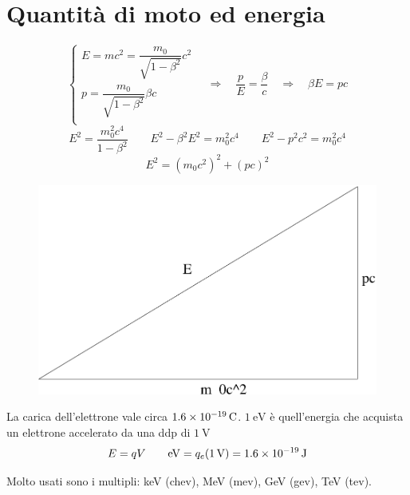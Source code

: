 \section{Quantità di moto ed energia}
\[\left\{
   \begin{array}{l}
      E=mc^2=\dfrac{m_0}{\sqrt{1-\beta^2}}c^2 \\
      p=\dfrac{m_0}{\sqrt{1-\beta^2}}\beta c  \\
   \end{array}\right.
   \quad\Rightarrow\quad
   \dfrac{p}{E}=\dfrac{\beta}{c}
   \quad\Rightarrow\quad\beta E=pc
\]
\[E^2=\frac{m_0^2c^4}{1-\beta^2}\qquad E^2-\beta^2 E^2=m_0^2c^4\qquad E^2-p^2c^2=m_0^2c^4\]
\[E^2=(m_0c^2)^2+(pc)^2\]
\begin{figure}[htbp]
   \centering
   \includegraphics[scale=0.4]{immagini/fisica1/Trg_rel}
\end{figure}

\begin{Def}
   La carica dell'elettrone vale circa $\SI{1.6E-19}{\coulomb}$. $\SI{1}{\electronvolt}$ è quell'energia che acquista un elettrone accelerato da una ddp di $\SI{1}{\volt}$
   \[
      E=qV\qquad \si{\electronvolt}=q_e(\SI{1}{\volt})=\SI{1.6E-19}{\joule}
   \]

\end{Def}

Molto usati sono i multipli: \si{\kilo\electronvolt} (chev), \si{\mega\electronvolt} (mev), \si{\giga\electronvolt} (gev), \si{\tera\electronvolt} (tev).

